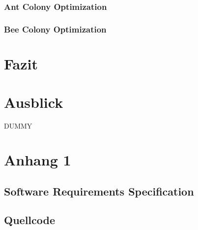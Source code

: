 \documentclass[a4paper, 11pt]{article}
\makeatletter
\newcommand*{\appendixtoc}{%
	\begingroup
	\edef\@alltocdepth{\the\value{tocdepth}}%
	\setcounter{tocdepth}{-10000}%
	\renewcommand*{\contentsname}{%
		Verzeichnis der Anh\"ange}%
	\renewcommand*{\appendixattoc}{%
		\setcounter{tocdepth}{\@alltocdepth}%
	}%
	\tableofcontents%
	\setcounter{tocdepth}{\@alltocdepth}%
	\endgroup
}
\newcommand*{\appendixattoc}{%
}
\makeatother
\begin{document}
\subsubsection{Ant Colony Optimization}
\subsubsection{Bee Colony Optimization}
\section{Fazit}
\section{Ausblick}





\newpage
\begin{thebibliography}{sotief}
	DUMMY
\end{thebibliography}
\newpage
\appendix
\appendixtoc
\newpage
\section{Anhang 1} 
\subsection{Software Requirements Specification}
\subsection{Quellcode}
\end{document}
